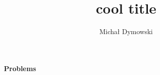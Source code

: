\documentclass[
leqno,           %
10pt,            %
a4paper          %
]{amsart}
\title{
	cool title
	}
\author{
	\large{Michał Dymowski}
	}
\date{}
\begin{document}

\begin{large}\begin{center}
   {\bf Problems}
\end{center}\end{large}

	\maketitle
\end{document}
